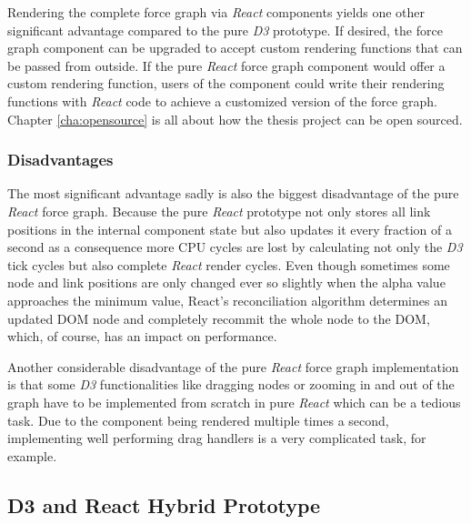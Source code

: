 Rendering the complete force graph via \emph{React} components yields one other significant advantage compared to the pure \emph{D3} prototype. If desired, the force graph component can be upgraded to accept custom rendering functions that can be passed from outside. If the pure \emph{React} force graph component would offer a custom rendering function, users of the component could write their rendering functions with \emph{React} code to achieve a customized version of the force graph. Chapter \ref{cha:opensource} is all about how the thesis project can be open sourced.

\subsubsection{Disadvantages}

The most significant advantage sadly is also the biggest disadvantage of the pure \emph{React} force graph. Because the pure \emph{React} prototype not only stores all link positions in the internal component state but also updates it every fraction of a second as a consequence more CPU cycles are lost by calculating not only the \emph{D3} tick cycles but also complete \emph{React} render cycles. Even though sometimes some node and link positions are only changed ever so slightly when the alpha value approaches the minimum value, React's reconciliation algorithm determines an updated DOM node and completely recommit the whole node to the DOM, which, of course, has an impact on performance.

Another considerable disadvantage of the pure \emph{React} force graph implementation is that some \emph{D3} functionalities like dragging nodes or zooming in and out of the graph have to be implemented from scratch in pure \emph{React} which can be a tedious task. Due to the component being rendered multiple times a second, implementing well performing drag handlers is a very complicated task, for example.


\subsection{D3 and React Hybrid Prototype}
\label{sub:D3AndReactHybrid}

